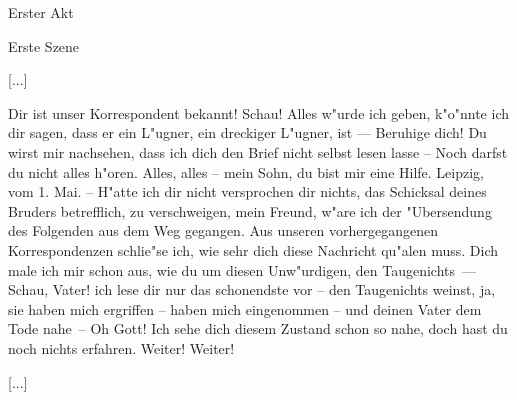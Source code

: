 
\begin{center}

\Large{Erster Akt}

\large{Erste Szene}

\end{center}


[...]



\begin{drama}

\franspeaks {} Dir ist unser Korrespondent bekannt! Schau! Alles w"urde ich geben, k"o"nnte ich dir sagen, dass er ein L"ugner, ein dreckiger L"ugner, ist --- Beruhige dich! Du wirst mir nachsehen, dass ich dich den Brief nicht selbst lesen lasse -- Noch darfst du nicht alles h"oren.
\moorspeaks Alles, alles -- mein Sohn, du bist mir eine Hilfe.
\franspeaks {} \frqq Leipzig, vom 1. Mai. -- H"atte ich dir nicht versprochen dir nichts, das Schicksal deines Bruders betrefflich, zu verschweigen, mein Freund, w"are ich der "Ubersendung des Folgenden aus dem Weg gegangen. Aus unseren vorhergegangenen Korrespondenzen schlie"se ich, wie sehr dich diese Nachricht qu"alen muss. Dich male ich mir schon aus, wie du um diesen Unw"urdigen, den Taugenichts\flqq \ ---  Schau, Vater! ich lese dir nur das schonendste vor -- \frqq den Taugenichts weinst\flqq , ja, sie haben mich ergriffen -- haben mich eingenommen -- \frqq und deinen Vater dem Tode nahe\flqq \ -- Oh Gott! Ich sehe dich diesem Zustand schon so nahe, doch hast du noch nichts erfahren.
\moorspeaks Weiter! Weiter!

\end{drama}

[...]

\endinput